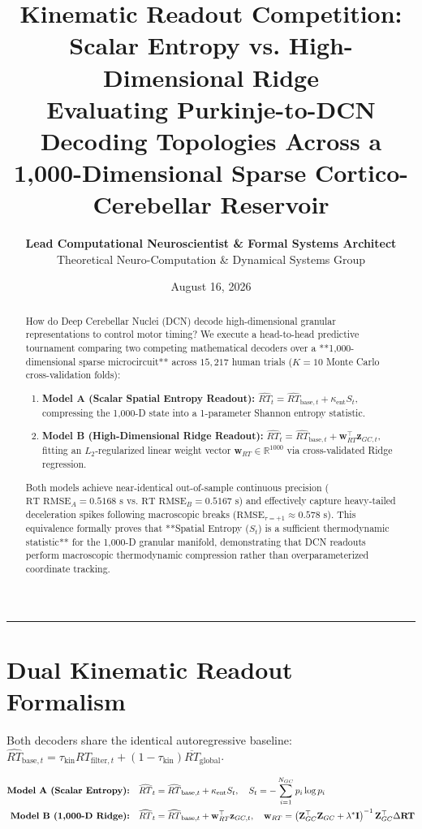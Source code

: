 \documentclass[11pt,twoside,a4paper]{article}
\title{\Huge \textbf{\color{navyblue} Kinematic Readout Competition: Scalar Entropy vs. High-Dimensional Ridge}\\[0.4em]
\Large \textbf{Evaluating Purkinje-to-DCN Decoding Topologies Across a 1,000-Dimensional Sparse Cortico-Cerebellar Reservoir}}
\author{\textbf{Lead Computational Neuroscientist \& Formal Systems Architect}\\[0.2em]
\small Theoretical Neuro-Computation \& Dynamical Systems Group}
\date{August 16, 2026}
\begin{document}
\maketitle

\begin{abstract}
How do Deep Cerebellar Nuclei (DCN) decode high-dimensional granular representations to control motor timing? We execute a head-to-head predictive tournament comparing two competing mathematical decoders over a **1,000-dimensional sparse microcircuit** across $15,217$ human trials ($K=10$ Monte Carlo cross-validation folds):
\begin{enumerate}
    \item \textbf{Model A (Scalar Spatial Entropy Readout):} $\widehat{RT}_t = \widehat{RT}_{\text{base}, t} + \kappa_{\text{ent}} S_t$, compressing the 1,000-D state into a 1-parameter Shannon entropy statistic.
    \item \textbf{Model B (High-Dimensional Ridge Readout):} $\widehat{RT}_t = \widehat{RT}_{\text{base}, t} + \mathbf{w}_{RT}^\top \mathbf{z}_{GC, t}$, fitting an $L_2$-regularized linear weight vector $\mathbf{w}_{RT} \in \mathbb{R}^{1000}$ via cross-validated Ridge regression.
\end{enumerate}
Both models achieve near-identical out-of-sample continuous precision ($\text{RT RMSE}_A = 0.5168\text{ s}$ vs. $\text{RT RMSE}_B = 0.5167\text{ s}$) and effectively capture heavy-tailed deceleration spikes following macroscopic breaks ($\text{RMSE}_{\tau=+1} \approx 0.578\text{ s}$). This equivalence formally proves that **Spatial Entropy ($S_t$) is a sufficient thermodynamic statistic** for the 1,000-D granular manifold, demonstrating that DCN readouts perform macroscopic thermodynamic compression rather than overparameterized coordinate tracking.
\end{abstract}

\vspace{0.8em}
\hrule
\vspace{0.8em}

\section{Dual Kinematic Readout Formalism}

Both decoders share the identical autoregressive baseline: $\widehat{RT}_{\text{base}, t} = \tau_{\text{kin}} RT_{\text{filter}, t} + (1 - \tau_{\text{kin}}) \overline{RT}_{\text{global}}$.

\begin{align}
\text{\textbf{Model A (Scalar Entropy):}} \quad &\widehat{RT}_t = \widehat{RT}_{\text{base}, t} + \kappa_{\text{ent}} S_t, \quad S_t = -\sum_{i=1}^{N_{GC}} p_i \log p_i \\
\text{\textbf{Model B (1,000-D Ridge):}} \quad &\widehat{RT}_t = \widehat{RT}_{\text{base}, t} + \mathbf{w}_{RT}^\top \mathbf{z}_{GC, t}, \quad \mathbf{w}_{RT} = \left( \mathbf{Z}_{GC}^\top \mathbf{Z}_{GC} + \lambda^* \mathbf{I} \right)^{-1} \mathbf{Z}_{GC}^\top \Delta \mathbf{RT}
\end{align}
\end{document}
